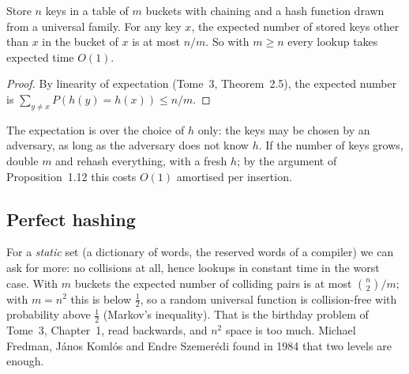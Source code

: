 \begin{proposition}\label{prop:chaining}
Store $n$ keys in a table of $m$ buckets with chaining and a hash function drawn from a universal family. For any key $x$, the expected number of stored keys
other than $x$ in the bucket of $x$ is at most $n/m$. So with $m\ge n$ every lookup takes expected time $O(1)$.
\end{proposition}
\begin{proof}
By linearity of expectation (Tome~3, Theorem~2.5), the expected number is $\sum_{y\ne x}P(h(y)=h(x))\le n/m$.
\end{proof}

The expectation is over the choice of $h$ only: the keys may be chosen by an adversary, as long as the adversary does not know $h$. If the number of keys grows,
double $m$ and rehash everything, with a fresh $h$; by the argument of Proposition~1.12 this costs $O(1)$ amortised per insertion.

\subsection*{Perfect hashing}

For a \emph{static} set (a dictionary of words, the reserved words of a compiler) we can ask for more: no collisions at all, hence lookups in constant time in the
worst case. With $m$ buckets the expected number of colliding pairs is at most $\binom n2/m$; with $m=n^2$ this is below $\frac12$, so a random universal function is
collision-free with probability above $\frac12$ (Markov's inequality). That is the birthday problem of Tome~3, Chapter~1, read backwards, and $n^2$ space is too much.
Michael Fredman, J\'anos Koml\'os and Endre Szemer\'edi found in 1984 that two levels are enough.

